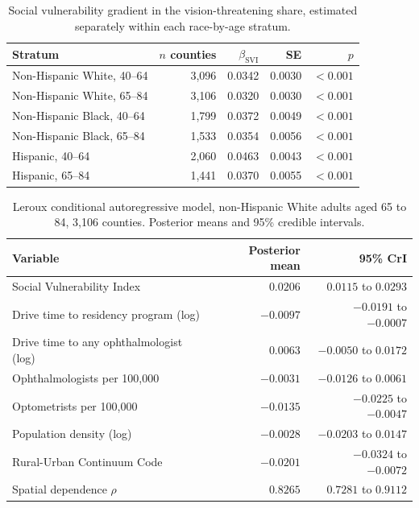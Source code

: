 \documentclass[11pt]{article}
\begin{document}
\begin{table}[htbp]
\centering
\caption{Social vulnerability gradient in the vision-threatening share,
estimated separately within each race-by-age stratum.}
\label{tab:strata}
\begin{tabular}{lrrrr}
\toprule
Stratum & $n$ counties & $\beta_{\text{SVI}}$ & SE & $p$ \\
\midrule
Non-Hispanic White, 40--64 & 3,096 & 0.0342 & 0.0030 & $<0.001$ \\
Non-Hispanic White, 65--84 & 3,106 & 0.0320 & 0.0030 & $<0.001$ \\
Non-Hispanic Black, 40--64 & 1,799 & 0.0372 & 0.0049 & $<0.001$ \\
Non-Hispanic Black, 65--84 & 1,533 & 0.0354 & 0.0056 & $<0.001$ \\
Hispanic, 40--64           & 2,060 & 0.0463 & 0.0043 & $<0.001$ \\
Hispanic, 65--84           & 1,441 & 0.0370 & 0.0055 & $<0.001$ \\
\bottomrule
\end{tabular}
\end{table}

\begin{table}[htbp]
\centering
\caption{Leroux conditional autoregressive model, non-Hispanic White adults aged
65 to 84, 3,106 counties. Posterior means and 95\% credible intervals.}
\label{tab:spatial}
\begin{tabular}{lrr}
\toprule
Variable & Posterior mean & 95\% CrI \\
\midrule
Social Vulnerability Index             & $0.0206$  & $0.0115$ to $0.0293$ \\
Drive time to residency program (log)  & $-0.0097$ & $-0.0191$ to $-0.0007$ \\
Drive time to any ophthalmologist (log)& $0.0063$  & $-0.0050$ to $0.0172$ \\
Ophthalmologists per 100,000           & $-0.0031$ & $-0.0126$ to $0.0061$ \\
Optometrists per 100,000               & $-0.0135$ & $-0.0225$ to $-0.0047$ \\
Population density (log)               & $-0.0028$ & $-0.0203$ to $0.0147$ \\
Rural-Urban Continuum Code             & $-0.0201$ & $-0.0324$ to $-0.0072$ \\
\midrule
Spatial dependence $\rho$              & $0.8265$  & $0.7281$ to $0.9112$ \\
\bottomrule
\end{tabular}
\end{table}
\end{document}

